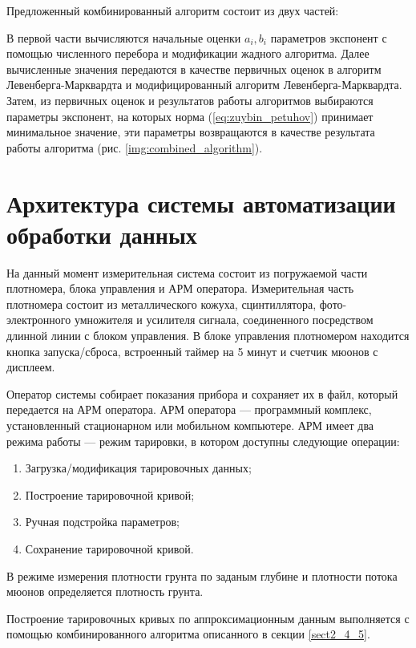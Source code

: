 Предложенный комбинированный алгоритм состоит из двух частей: 

В первой части вычисляются начальные оценки $a_i, b_i$ параметров экспонент с помощью численного перебора и модификации жадного алгоритма. 
Далее вычисленные значения передаются в качестве первичных оценок в алгоритм Левенберга-Марквардта
 и модифицированный алгоритм Левенберга-Марквардта. Затем, из первичных оценок и результатов работы алгоритмов
 выбираются параметры экспонент, на которых норма (\ref{eq:zuybin_petuhov}) принимает минимальное значение,
 эти параметры возвращаются в качестве результата работы алгоритма  (рис. \ref{img:combined_algorithm}).


\section{Архитектура системы автоматизации обработки данных}\label{subsect2_5}

На данный момент измерительная система состоит из погружаемой части плотномера, блока управления и АРМ оператора. Измерительная часть плотномера состоит из металлического кожуха, сцинтиллятора, фото-электронного умножителя и усилителя сигнала, соединенного посредством длинной линии с блоком управления. В блоке управления плотномером находится кнопка запуска/сброса, встроенный таймер на 5 минут и счетчик мюонов с дисплеем.

Оператор системы собирает показания прибора и сохраняет их в файл, который передается на АРМ оператора. АРМ оператора --- программный комплекс, установленный стационарном или мобильном компьютере. АРМ имеет два режима работы --- режим тарировки, в котором доступны следующие операции:

\begin{enumerate}
	\item Загрузка/модификация тарировочных данных;
	\item Построение тарировочной кривой;
	\item Ручная подстройка параметров;
	\item Сохранение тарировочной кривой.
\end{enumerate}

В режиме измерения плотности грунта по заданым глубине и плотности потока мюонов определяется плотность грунта.

Построение тарировочных кривых по аппроксимационным данным выполняется с помощью комбинированного алгоритма описанного в секции \ref{sect2_4_5}.

